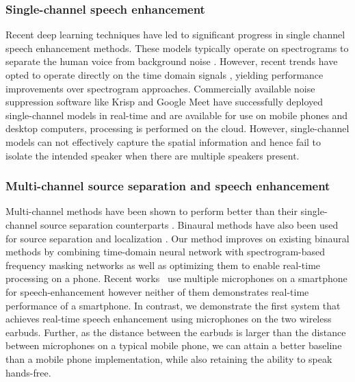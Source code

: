 \documentclass [11pt, proquest] {uwthesis}[2020/02/24]
\begin{document}
\subsubsection{Single-channel speech enhancement}
Recent deep learning techniques have led to significant progress in single channel speech enhancement methods. These models typically operate on spectrograms to separate the human voice from background noise \cite{realtimenoise, Mohammadiha_2013, online_nonnegative, nikzad2020deep, choi2019phaseaware, lstm_speechenhancement, fu2019metricgan, TFMasking}. However, recent trends have opted to operate directly on the time domain signals \cite{luo2019conv, germain2018speech, pascual2017segan, demucsreal, macartney2018improved}, yielding performance improvements over spectrogram approaches. Commercially available noise suppression software like Krisp \cite{krisp} and Google Meet \cite{googlemeet} have successfully deployed single-channel models in real-time and are available for use on mobile phones and desktop computers, processing is performed on the cloud. However, single-channel models can not effectively capture the spatial information and hence fail to isolate the intended speaker when there are multiple speakers present.


\subsubsection{Multi-channel source separation and speech enhancement}
Multi-channel methods have been shown to perform better than their single-channel source separation counterparts \cite{yoshioka2018multi, chen2018multi, zhang2017deep, gu2020enhancing, tzirakis2021multichannel, jenrungrot2020cone}. Binaural methods have also been used for source separation \cite{binaural1, han2020realtime, li2011two, reindl2010speech} and localization \cite{van2008binaural, lyon1983computational, kock1950binaural}. Our method improves on existing binaural methods by combining time-domain neural network with spectrogram-based frequency masking networks as well as optimizing them to enable   real-time processing on a phone. Recent works~\cite{binaural_osu, dual_phone} use multiple microphones on a smartphone for  speech-enhancement however neither of them demonstrates real-time performance of a smartphone. In contrast, we demonstrate the first system that achieves real-time speech enhancement using microphones on the two wireless earbuds. Further, as the distance between the earbuds is larger than the distance between microphones on a typical mobile phone, we can  attain a better baseline than a mobile phone implementation, while also retaining the ability to speak hands-free.
\end{document}
